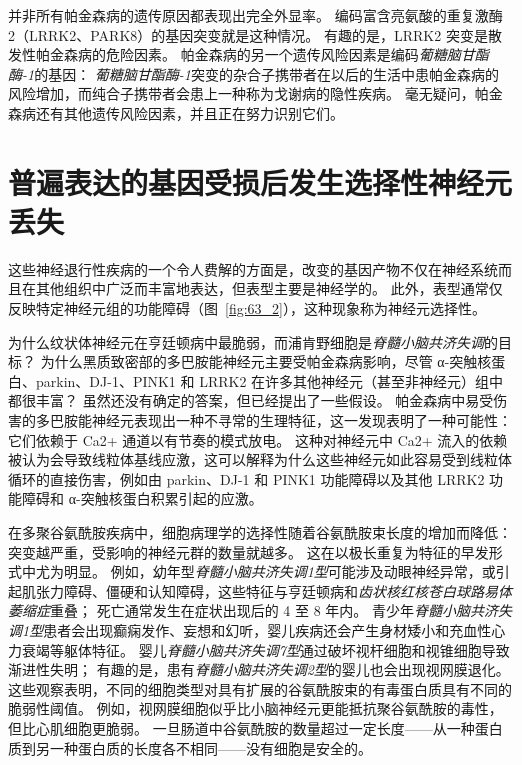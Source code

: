 并非所有帕金森病的遗传原因都表现出完全外显率。
编码富含亮氨酸的重复激酶 2（LRRK2、PARK8）的基因突变就是这种情况。
有趣的是，LRRK2 突变是散发性帕金森病的危险因素。
帕金森病的另一个遗传风险因素是编码\textit{葡糖脑甘酯酶-1}的基因：
\textit{葡糖脑甘酯酶-1}突变的杂合子携带者在以后的生活中患帕金森病的风险增加，而纯合子携带者会患上一种称为戈谢病的隐性疾病。
毫无疑问，帕金森病还有其他遗传风险因素，并且正在努力识别它们。



\section{普遍表达的基因受损后发生选择性神经元丢失}

这些神经退行性疾病的一个令人费解的方面是，改变的基因产物不仅在神经系统而且在其他组织中广泛而丰富地表达，但表型主要是神经学的。
此外，表型通常仅反映特定神经元组的功能障碍（图~\ref{fig:63_2}），这种现象称为神经元选择性。


为什么纹状体神经元在亨廷顿病中最脆弱，而浦肯野细胞是\textit{脊髓小脑共济失调}的目标？
为什么黑质致密部的多巴胺能神经元主要受帕金森病影响，尽管 α-突触核蛋白、parkin、DJ-1、PINK1 和 LRRK2 在许多其他神经元（甚至非神经元）组中都很丰富？
虽然还没有确定的答案，但已经提出了一些假设。
帕金森病中易受伤害的多巴胺能神经元表现出一种不寻常的生理特征，这一发现表明了一种可能性：
它们依赖于 Ca2+ 通道以有节奏的模式放电。
这种对神经元中 Ca2+ 流入的依赖被认为会导致线粒体基线应激，这可以解释为什么这些神经元如此容易受到线粒体循环的直接伤害，例如由 parkin、DJ-1 和 PINK1 功能障碍以及其他 LRRK2 功能障碍和 α-突触核蛋白积累引起的应激。


在多聚谷氨酰胺疾病中，细胞病理学的选择性随着谷氨酰胺束长度的增加而降低：
突变越严重，受影响的神经元群的数量就越多。
这在以极长重复为特征的早发形式中尤为明显。
例如，幼年型\textit{脊髓小脑共济失调1型}可能涉及动眼神经异常，或引起肌张力障碍、僵硬和认知障碍，这些特征与亨廷顿病和\textit{齿状核红核苍白球路易体萎缩症}重叠；
死亡通常发生在症状出现后的 4 至 8 年内。
青少年\textit{脊髓小脑共济失调1型}患者会出现癫痫发作、妄想和幻听，婴儿疾病还会产生身材矮小和充血性心力衰竭等躯体特征。
婴儿\textit{脊髓小脑共济失调7型}通过破坏视杆细胞和视锥细胞导致渐进性失明；
有趣的是，患有\textit{脊髓小脑共济失调2型}的婴儿也会出现视网膜退化。
这些观察表明，不同的细胞类型对具有扩展的谷氨酰胺束的有毒蛋白质具有不同的脆弱性阈值。
例如，视网膜细胞似乎比小脑神经元更能抵抗聚谷氨酰胺的毒性，但比心肌细胞更脆弱。
一旦肠道中谷氨酰胺的数量超过一定长度——从一种蛋白质到另一种蛋白质的长度各不相同——没有细胞是安全的。


